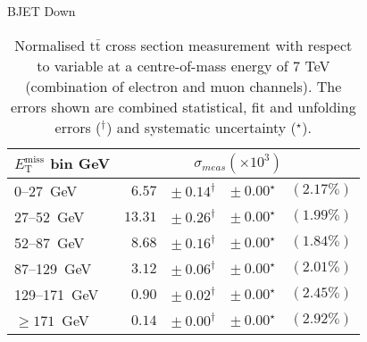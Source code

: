 \documentclass{article}
\newcommand{\ttbar}{\ensuremath{\text{t}\bar{\text{t}}}\xspace}
\newcommand{\GeV}{GeV}
\begin{document}
BJET Down
\begin{table}[H]
\setlength{\tabcolsep}{2pt}
\centering
\caption{Normalised \ttbar cross section measurement with respect to \MET variable
at a centre-of-mass energy of 7 TeV (combination of electron and muon channels). The errors shown
 are combined statistical, fit and unfolding errors ($^\dagger$) and systematic uncertainty ($^\star$).}
\label{tab:MET_xsections_7TeV_BJet_down_combined}
\begin{tabular}{lrrrr}
\hline
$E_{\mathrm{T}}^{\mathrm{miss}}$ bin GeV & \multicolumn{4}{c}{$\sigma_{meas} \left(\times
10^{3}\right)$}\\
\hline
0--27~\GeV &  $6.57$ & $ \pm~ 0.14^\dagger$ & $ \pm~ 0.00^\star$ & $(2.17\%)$\\ 
27--52~\GeV &  $13.31$ & $ \pm~ 0.26^\dagger$ & $ \pm~ 0.00^\star$ & $(1.99\%)$\\ 
52--87~\GeV &  $8.68$ & $ \pm~ 0.16^\dagger$ & $ \pm~ 0.00^\star$ & $(1.84\%)$\\ 
87--129~\GeV &  $3.12$ & $ \pm~ 0.06^\dagger$ & $ \pm~ 0.00^\star$ & $(2.01\%)$\\ 
129--171~\GeV &  $0.90$ & $ \pm~ 0.02^\dagger$ & $ \pm~ 0.00^\star$ & $(2.45\%)$\\ 
$\geq 171$~\GeV &  $0.14$ & $ \pm~ 0.00^\dagger$ & $ \pm~ 0.00^\star$ & $(2.92\%)$\\ 
\hline 
\end{tabular}
\end{table}
\end{document}
